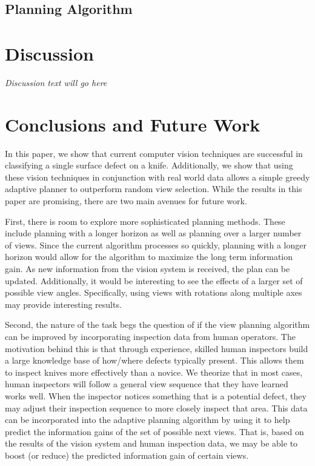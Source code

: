\documentclass[letterpaper, 10 pt, conference]{ieeeconf}  %
\begin{document}
\subsection{Planning Algorithm}

\section{Discussion}

\textit{Discussion text will go here}

\section{Conclusions and Future Work}

In this paper, we show that current computer vision techniques are successful in classifying a single surface defect on a knife. Additionally, we show that using these vision techniques in conjunction with real world data allows a simple greedy adaptive planner to outperform random view selection. While the results in this paper are promising, there are two main avenues for future work.

First, there is room to explore more sophisticated planning methods. These include planning with a longer horizon as well as planning over a larger number of views. Since the current algorithm processes so quickly, planning with a longer horizon would allow for the algorithm to maximize the long term information gain. As new information from the vision system is received, the plan can be updated. Additionally, it would be interesting to see the effects of a larger set of possible view angles. Specifically, using views with rotations along multiple axes may provide interesting results.

Second, the nature of the task begs the question of if the view planning algorithm can be improved by incorporating inspection data from human operators. The motivation behind this is that through experience, skilled human inspectors build a large knowledge base of how/where defects typically present. This allows them to inspect knives more effectively than a novice. We theorize that in most cases, human inspectors will follow a general view sequence that they have learned works well. When the inspector notices something that is a potential defect, they may adjust their inspection sequence to more closely inspect that area. This data can be incorporated into the adaptive planning algorithm by using it to help predict the information gains of the set of possible next views. That is, based on the results of the vision system and human inspection data, we may be able to boost (or reduce) the predicted information gain of certain views.



\end{document}
